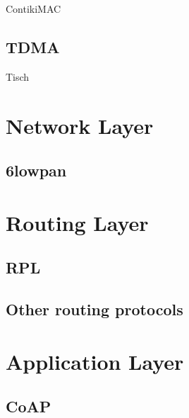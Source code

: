 ContikiMAC


\subsection{TDMA} %
\label{sub:tdma}

Tisch



\section{Network Layer} %
\label{sec:network_layer}

\subsection{6lowpan} %
\label{sub:6lowpan}

\lipsum



\section{Routing Layer} %
\label{sec:routing_layer}

\subsection{RPL} %
\label{sub:rpl}


\subsection{Other routing protocols} %
\label{sub:other_routing_protocols}



\section{Application Layer} %
\label{sec:application_layer}

\lipsum

\subsection{CoAP} %
\label{sub:coap}

